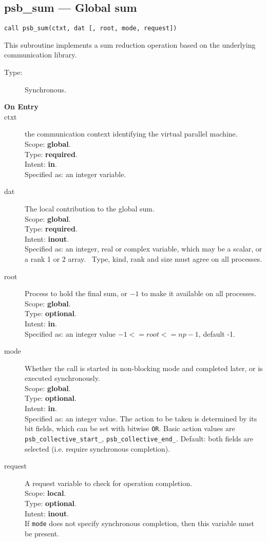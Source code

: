 \clearpage\subsection{psb\_sum --- Global sum}

\begin{verbatim}
call psb_sum(ctxt, dat [, root, mode, request])
\end{verbatim}

This subroutine implements a sum reduction  operation based on the
underlying communication library. 
\begin{description}
\item[Type:] Synchronous.
\item[\bf  On Entry ]
\item[ctxt] the communication context identifying the virtual
  parallel machine.\\
Scope: {\bf global}.\\
Type: {\bf required}.\\
Intent: {\bf in}.\\
Specified as: an integer variable.
\item[dat] The local contribution to the global sum.\\
Scope: {\bf global}.\\
Type: {\bf required}.\\
Intent: {\bf inout}.\\
Specified as: an integer, real or complex variable, which may be a
scalar, or a rank 1 or 2 array. \
Type, kind, rank and size must agree on all processes.
\item[root] Process to hold the final sum, or $-1$ to make it available
  on all processes.\\
Scope: {\bf global}.\\
Type: {\bf optional}.\\
Intent: {\bf in}.\\
Specified as: an integer value $-1<= root <= np-1$, default -1. \
\item[mode] Whether the call is started in non-blocking mode and completed
  later, or is executed synchronously.\\
Scope: {\bf global}.\\
Type: {\bf optional}.\\
Intent: {\bf in}.\\
Specified as: an integer value. The action to be taken is determined
by its bit fields, which can be set with bitwise \verb|OR|. Basic
action values are \verb|psb_collective_start_|, \verb|psb_collective_end_|.
Default:  both fields are selected (i.e. require synchronous completion).\\
\item[request] A request variable to check for operation completion.\\
Scope: {\bf local}.\\
Type: {\bf optional}.\\
Intent: {\bf inout}.\\
If \verb|mode| does not specify synchronous completion, then this
variable must be present.
\end{description}


